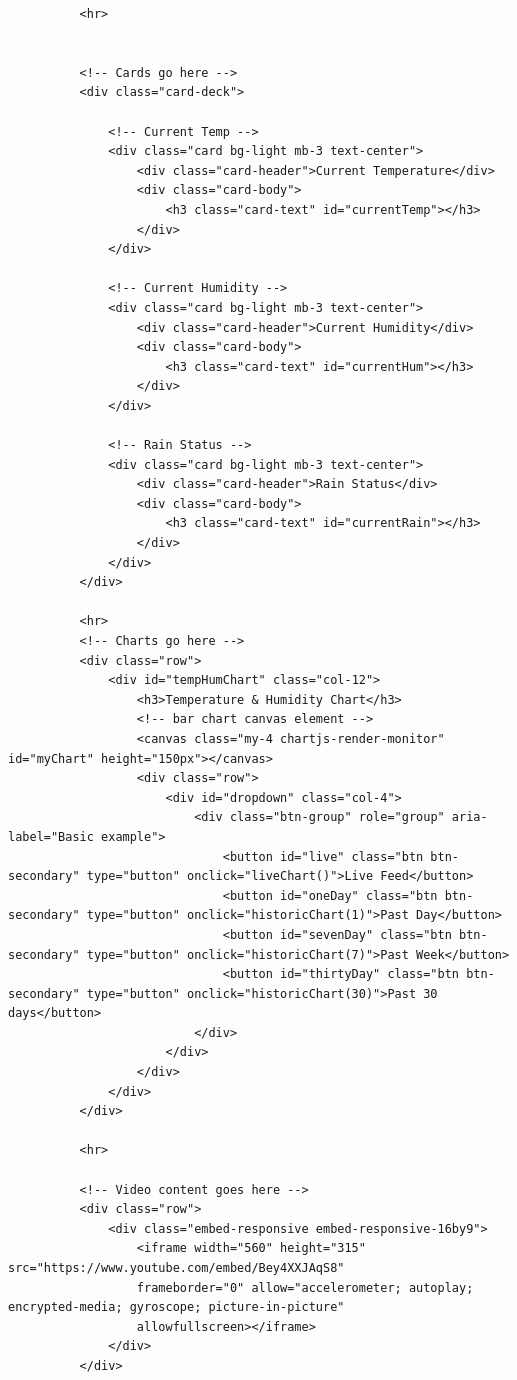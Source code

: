 \documentclass[10pt,a4paper]{article}
\begin{document}
\begin{verbatim}
          <hr>


          <!-- Cards go here -->
          <div class="card-deck">

              <!-- Current Temp -->
              <div class="card bg-light mb-3 text-center">
                  <div class="card-header">Current Temperature</div>
                  <div class="card-body">
                      <h3 class="card-text" id="currentTemp"></h3>
                  </div>
              </div>

              <!-- Current Humidity -->
              <div class="card bg-light mb-3 text-center">
                  <div class="card-header">Current Humidity</div>
                  <div class="card-body">
                      <h3 class="card-text" id="currentHum"></h3>
                  </div>
              </div>

              <!-- Rain Status -->
              <div class="card bg-light mb-3 text-center">
                  <div class="card-header">Rain Status</div>
                  <div class="card-body">
                      <h3 class="card-text" id="currentRain"></h3>
                  </div>
              </div>
          </div>

          <hr>
          <!-- Charts go here -->
          <div class="row">
              <div id="tempHumChart" class="col-12">
                  <h3>Temperature & Humidity Chart</h3>
                  <!-- bar chart canvas element -->
                  <canvas class="my-4 chartjs-render-monitor" id="myChart" height="150px"></canvas>
                  <div class="row">
                      <div id="dropdown" class="col-4">
                          <div class="btn-group" role="group" aria-label="Basic example">
                              <button id="live" class="btn btn-secondary" type="button" onclick="liveChart()">Live Feed</button>
                              <button id="oneDay" class="btn btn-secondary" type="button" onclick="historicChart(1)">Past Day</button>
                              <button id="sevenDay" class="btn btn-secondary" type="button" onclick="historicChart(7)">Past Week</button>
                              <button id="thirtyDay" class="btn btn-secondary" type="button" onclick="historicChart(30)">Past 30 days</button>
                          </div>
                      </div>
                  </div>
              </div>
          </div>

          <hr>

          <!-- Video content goes here -->
          <div class="row">
              <div class="embed-responsive embed-responsive-16by9">
                  <iframe width="560" height="315" src="https://www.youtube.com/embed/Bey4XXJAqS8"
                  frameborder="0" allow="accelerometer; autoplay; encrypted-media; gyroscope; picture-in-picture"
                  allowfullscreen></iframe>
              </div>
          </div>



\end{verbatim}
\end{document}
